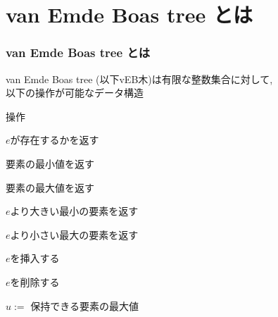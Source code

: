 \documentclass[main]{subfiles}
\begin{document}
\section{van Emde Boas tree とは}
\begin{frame}\frametitle{van Emde Boas tree とは}
	van Emde Boas tree (以下vEB木)は有限な整数集合に対して,\\以下の操作が可能なデータ構造
\begin{block}{操作}
\begin{description}
\setlength{\labelwidth}{15ex}
\setlength{\itemindent}{8ex}
\item[$\func{member}(e)$]		$e$が存在するかを返す\\
\item[$\min()$]			要素の最小値を返す\\
\item[$\max()$]			要素の最大値を返す\\
\item[$\func{successor}(e)$]	$e$より大きい最小の要素を返す\\
\item[$\func{predecessor}(e)$]	$e$より小さい最大の要素を返す\\
\item[$\func{insert}(e)$]		$e$を挿入する\\
\item[$\func{delete}(e)$]		$e$を削除する\\
\end{description}
\end{block}
\begin{block}{}
\end{block}
{\small $u :=$ 保持できる要素の最大値}
\end{frame}
\end{document}
